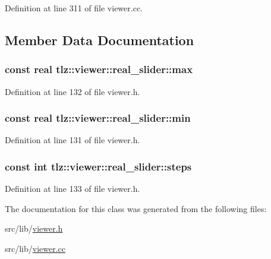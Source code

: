 Definition at line 311 of file viewer.\+cc.



\subsection{Member Data Documentation}
\subsubsection[{\texorpdfstring{max}{max}}]{\setlength{\rightskip}{0pt plus 5cm}const {\bf real} tlz\+::viewer\+::real\+\_\+slider\+::max}\hypertarget{classtlz_1_1viewer_1_1real__slider_aeea8984e29061a13bd5416a03890488b}{}\label{classtlz_1_1viewer_1_1real__slider_aeea8984e29061a13bd5416a03890488b}


Definition at line 132 of file viewer.\+h.

\subsubsection[{\texorpdfstring{min}{min}}]{\setlength{\rightskip}{0pt plus 5cm}const {\bf real} tlz\+::viewer\+::real\+\_\+slider\+::min}\hypertarget{classtlz_1_1viewer_1_1real__slider_a62ed7a6f85b5b5eb3bfcf39f427a52c8}{}\label{classtlz_1_1viewer_1_1real__slider_a62ed7a6f85b5b5eb3bfcf39f427a52c8}


Definition at line 131 of file viewer.\+h.

\subsubsection[{\texorpdfstring{steps}{steps}}]{\setlength{\rightskip}{0pt plus 5cm}const int tlz\+::viewer\+::real\+\_\+slider\+::steps}\hypertarget{classtlz_1_1viewer_1_1real__slider_a8f182f96542ca63e12a0628c86aa6a72}{}\label{classtlz_1_1viewer_1_1real__slider_a8f182f96542ca63e12a0628c86aa6a72}


Definition at line 133 of file viewer.\+h.



The documentation for this class was generated from the following files\+:\begin{DoxyCompactItemize}
\item 
src/lib/\hyperlink{viewer_8h}{viewer.\+h}\item 
src/lib/\hyperlink{lib_2viewer_8cc}{viewer.\+cc}\end{DoxyCompactItemize}
